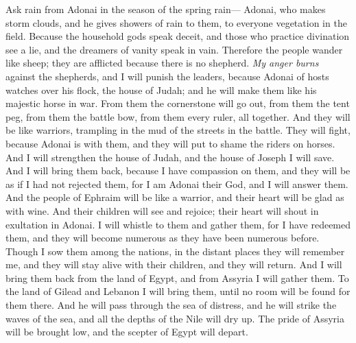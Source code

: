\begin{biblechapter} %
 Ask rain from Adonai in the season of the spring rain—
\verse Adonai, who makes storm clouds, 
and he gives showers of rain to them, 
to everyone vegetation in the field.
\verse Because the household gods speak deceit, 
and those who practice divination see a lie, 
and the dreamers of vanity speak in vain. 
Therefore the people wander like sheep; 
they are afflicted because there is no shepherd.
\verse \textit{My anger burns} against the shepherds, 
and I will punish the leaders, 
because Adonai of hosts watches over his flock, 
the house of Judah; 
and he will make them like his majestic horse in war.
\verse From them the cornerstone will go out, 
from them the tent peg, 
from them the battle bow, 
from them every ruler, 
all together.
\verse And they will be like warriors, 
trampling in the mud of the streets in the battle. 
They will fight, because Adonai is with them, 
and they will put to shame the riders on horses.
\verse And I will strengthen the house of Judah, 
and the house of Joseph I will save. 
And I will bring them back, because I have compassion on them, 
and they will be as if I had not rejected them, 
for I am Adonai their God, and I will answer them.
\verse And the people of Ephraim will be like a warrior, 
and their heart will be glad as with wine. 
And their children will see and rejoice; 
their heart will shout in exultation in Adonai.
\verse I will whistle to them and gather them, 
for I have redeemed them, 
and they will become numerous as they have been numerous before.
\verse Though I sow them among the nations, 
in the distant places they will remember me, 
and they will stay alive with their children, and they will return.
\verse And I will bring them back from the land of Egypt, 
and from Assyria I will gather them. 
To the land of Gilead and Lebanon I will bring them, 
until no room will be found for them there.
\verse And he will pass through the sea of distress, 
and he will strike the waves of the sea, 
and all the depths of the Nile will dry up. 
The pride of Assyria will be brought low, 
and the scepter of Egypt will depart.
\end{biblechapter}

